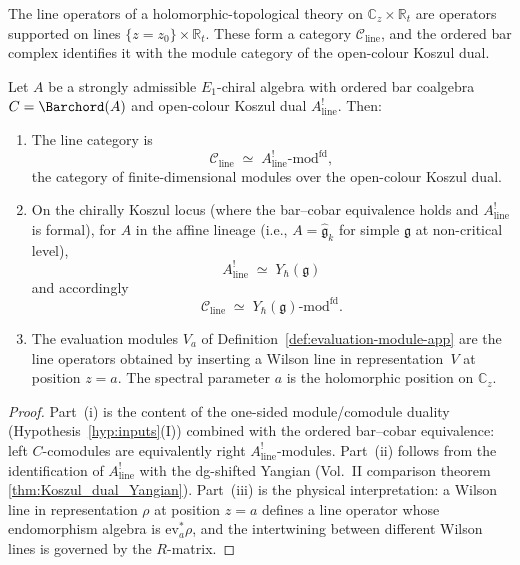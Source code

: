 The line operators of a holomorphic-topological theory on
$\mathbb{C}_z\times\mathbb{R}_t$ are operators supported on
lines $\{z=z_0\}\times\mathbb{R}_t$. These form a
category $\mathcal{C}_{\mathrm{line}}$, and the ordered bar
complex identifies it with the module category of the
open-colour Koszul dual.

\begin{theorem}
\label{thm:line-category}
Let $A$ be a strongly admissible $E_1$-chiral algebra
with ordered bar coalgebra $C=\Barchord(A)$ and
open-colour Koszul dual $A^!_{\mathrm{line}}$. Then:
\begin{enumerate}[label=(\roman*)]
\item The line category is
\[
\mathcal{C}_{\mathrm{line}}
\;\simeq\;
A^!_{\mathrm{line}}\text{-}\mathrm{mod}^{\mathrm{fd}},
\]
the category of finite-dimensional modules over the
open-colour Koszul dual.

\item On the chirally Koszul locus \textup{(}where the bar--cobar
equivalence holds and $A^!_{\mathrm{line}}$ is formal\textup{)},
for $A$ in the affine lineage
\textup{(}i.e., $A=\hat{\mathfrak{g}}_k$
for simple $\mathfrak{g}$ at non-critical level\textup{)},
\[
A^!_{\mathrm{line}}
\;\simeq\;
Y_\hbar(\mathfrak{g})
\]
and accordingly
\[
\mathcal{C}_{\mathrm{line}}
\;\simeq\;
Y_\hbar(\mathfrak{g})\text{-}\mathrm{mod}^{\mathrm{fd}}.
\]

\item The evaluation modules $V_a$ of
Definition~\textup{\ref{def:evaluation-module-app}} are the line
operators obtained by inserting a Wilson line in
representation~$V$ at position $z=a$. The spectral
parameter $a$ is the holomorphic position on $\mathbb{C}_z$.
\end{enumerate}
\end{theorem}

\begin{proof}
Part~(i) is the content of the one-sided module/comodule
duality (Hypothesis~\ref{hyp:inputs}(I)) combined with
the ordered bar--cobar equivalence: left $C$-comodules are
equivalently right $A^!_{\mathrm{line}}$-modules.
Part~(ii) follows from the identification of
$A^!_{\mathrm{line}}$ with the dg-shifted Yangian
\textup{(}Vol.~II comparison theorem
\ref*{thm:Koszul_dual_Yangian}\textup{)}.
Part~(iii) is the physical interpretation: a Wilson line in
representation $\rho$ at position $z=a$ defines a line
operator whose endomorphism algebra is
$\mathrm{ev}_a^*\rho$, and the intertwining between
different Wilson lines is governed by the $R$-matrix.
\end{proof}

